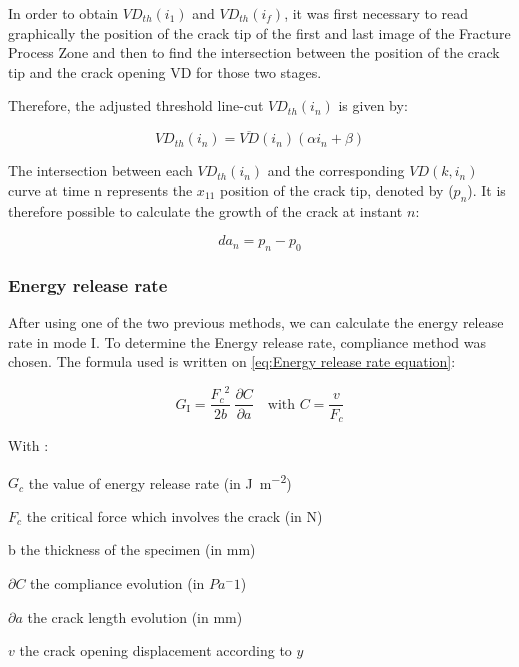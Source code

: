 \documentclass[3p,times,procedia]{elsarticle}
\begin{document}
In order to obtain $VD_{th}(i_1)$ and $VD_{th}(i_f)$, it was first necessary to read graphically the position of the crack tip of the first and last image of the Fracture Process Zone and then to find the intersection between the position of the crack tip and the crack opening VD for those two stages.

Therefore, the adjusted threshold line-cut $VD_{th}(i_n)$ is given by:

\begin{equation}
	VD_{th}(i_n)=\overline{VD}(i_n)(\alpha i_n +\beta)
	\label{eq:eq26}
\end{equation}

The intersection between each $VD_{th}(i_n)$ and the corresponding $VD(k, i_n)$ curve at time n represents the $x_{11}$ position of the crack tip, denoted by ($p_n$).
It is therefore possible to calculate the growth of the crack at instant $n$:

\begin{equation}
	da_n=p_n-p_0
	\label{eq:eq27}
\end{equation}

\subsubsection{Energy release rate}

After using one of the two previous methods, we can calculate the energy release rate in mode I. To determine the Energy release rate, compliance method was chosen. 
The formula used is written on \ref{eq:Energy release rate equation}:

\begin{equation}
	G_\text{I}=\displaystyle\frac{{F_{c}}^2}{2b}\ \frac{\partial C}{\partial a} \quad \text{with } C=\frac{v}{F_{c}} 	
	\label{eq:Energy release rate equation}
\end{equation} 
 
With : 

$G_c$ the value of energy release rate (in \si{\joule\per\square\meter})

$F_c$ the critical force which involves the crack (in \si{\newton})

b the thickness of the specimen (in \si{\milli\meter})

$\partial C$ the compliance evolution (in $Pa^-1$)

$\partial a$ the crack length evolution (in \si{\milli\meter})

$v$ the crack opening displacement according to $y$
\end{document}
